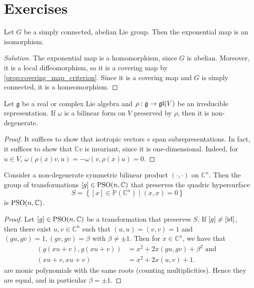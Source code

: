 \documentclass{report}
\begin{document}
\chapter{Exercises}
\begin{exercise}
    Let $G$ be a simply connected, abelian Lie group.
    Then the exponential map is an isomorphism.
\end{exercise}
\begin{proof}[Solution]
    The exponential map is a homomorphism, since $G$ is abelian.
    Moreover, it is a local diffeomorphism, so it is a covering map by \cref{prop:covering_map_criterion}.
    Since it is a covering map and $G$ is simply connected, it is a homeomorphism.
\end{proof}

\begin{exercise}
    Let $\mathfrak g$ be a real or complex Lie algebra and $\rho:\mathfrak g \to \operatorname{{\mathfrak{gl}}}(V)$ be an irreducible representation.
    If $\omega$ is a bilinear form on $V$ preserved by $\rho$, then it is non-degenerate.
\end{exercise}
\begin{proof}
    It suffices to show that isotropic vectors $v$ span subrepresentations.
    In fact, it suffices to show that $\mathbb C v$ is invariant, since it is one-dimensional.
    Indeed, for $u \in V$, $\omega(\rho(x)v, u) = -\omega(v, \rho(x)u) = 0$.
\end{proof}

\begin{exercise}
    Consider a non-degenerate symmetric bilinear product $(\cdot, \cdot)$ on $\mathbb C^n$.
    Then the group of transformations $[g] \in \operatorname{{\mathrm{PSO}}}(n, \mathbb C)$ that preserves the quadric hypersurface
    \[
    S = \left\{ [x] \in \mathbb P(\mathbb C^n) \mid (x,x) = 0 \right\}
    \]
    is $\operatorname{{\mathrm{PSO}}}(n, \mathbb C)$.
\end{exercise}
\begin{proof}
    Let $[g] \in \operatorname{{\mathrm{PSO}}}(n, \mathbb C)$ be a transformation that preserves $S$.
    If $[g] \neq [\operatorname{id}]$, then there exist $u, v \in \mathbb C^n$ such that $(u,u) = (v,v) = 1$ and $(gu, gv) = 1, (gv, gv) = \beta$ with $\beta \neq \pm 1$.
    Then for $x \in \mathbb C^n$, we have that
    \begin{align*}
        (g(xu + v), g(xu + v)) &= x^2 + 2x(gu, gv) + \beta^2 \text{ and }\\
        (xu + v, xu + v) &= x^2 + 2x(u,v) + 1.
    \end{align*}
    are monic polynomials with the same roots (counting multiplicities).
    Hence they are equal, and in particular $\beta = \pm 1$.
\end{proof}
\end{document}
